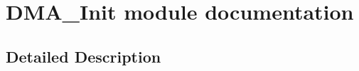 \hypertarget{group___d_m_a___init__module}{}\section{D\+M\+A\+\_\+\+Init module documentation}
\label{group___d_m_a___init__module}


\subsection{Detailed Description}

